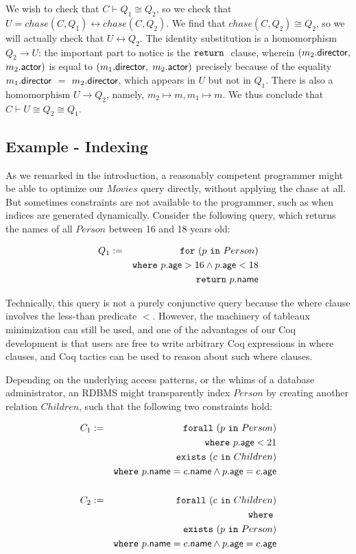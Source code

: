 \documentclass[preprint]{sigplanconf}
\newcommand{\FOR}{{\tt for} \ }
\newcommand{\FORALL}{{\tt forall} \ }
\newcommand{\EXISTS}{{\tt exists} \ }
\newcommand{\WHERE}{{\tt where} \ }
\newcommand{\IN}{ \ {\tt in} \ }
\newcommand{\RETURN}{{\tt return} \ }
\begin{document}
We wish to check that $C \vdash Q_1 \cong Q_2$, so we check that $U = chase(C,Q_1) \leftrightarrow chase(C, Q_2)$.  We find that $chase(C, Q_2) \cong Q_2$, so we will actually check that  $U \leftrightarrow Q_2$.  The identity substitution is a homomorphism $Q_2 \to U$: the important part to notice is the $\RETURN$ clause, wherein $(m_2.{\sf director},$ $m_2.{\sf actor})$ is equal to $(m_1.{\sf director},$ $m_2.{\sf actor})$ precisely because 
of the equality $m_1.{\sf director}$ $=$ $m_2.{\sf director}$, which appears in $U$ 
but not in $Q_1$.  There is also a homomorphism $U \to Q_2$, namely, $m_2 
\mapsto m, m_1 \mapsto m$.  We thus conclude that $C \vdash U \cong Q_2 \cong Q_1$. 
\newpage
\subsection*{Example - Indexing}

As we remarked in the introduction, a reasonably competent programmer might be able to optimize our $Movies$ query directly, without applying the chase at all.  But sometimes constraints are not available to the programmer, such as when indices are generated dynamically.  Consider the following query, which returns the names of all $Person$ between 16 and 18 years old:
\begin{normalsize}
\begin{eqnarray*}
Q_1 & := & \FOR (p \IN Person) \\
 & & \WHERE p.{\sf age} > 16 \wedge p.{\sf age} < 18 \\
 & & \RETURN p.{\sf name}
\end{eqnarray*}   
\end{normalsize}
Technically, this query is not a purely conjunctive query because the where clause involves the less-than predicate $<$.  However, the machinery of tableaux minimization can still be used, and one of the advantages of our Coq development is that users are free to write arbitrary Coq expressions in where clauses, and Coq tactics can be used to reason about such where clauses.
  
Depending on the underlying access patterns, or the whims of a database administrator, an RDBMS might transparently index $Person$ by creating another relation $Children$, such that the following two constraints hold:
\begin{normalsize}
\begin{eqnarray*}
C_1 & := & \FORALL (p \IN Person) \\
 & & \WHERE p.{\sf age} < 21 \\
 & & \EXISTS (c \IN Children) \\
 & & \WHERE p.{\sf name} = c.{\sf name} \wedge p.{\sf age} = c.{\sf age}  \\
 & & \\
  C_2 & := & \FORALL (c \IN Children) \\
  & & \WHERE \\
 & & \EXISTS (p \IN Person) \\
 & & \WHERE p.{\sf name} = c.{\sf name} \wedge p.{\sf age} = c.{\sf age}
\end{eqnarray*}       
\end{normalsize}
\end{document}
